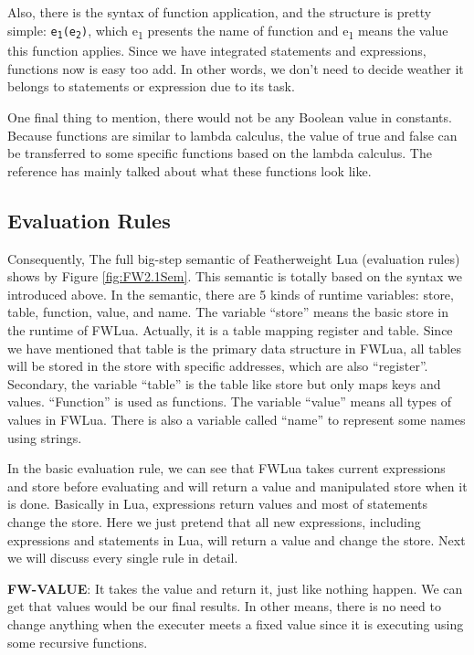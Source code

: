 Also, there is the syntax of function application, and the structure is pretty simple: {\tt e\textsubscript{1}(e\textsubscript{2})}, which e\textsubscript{1} presents the name of function and e\textsubscript{1} means the value this function applies. Since we have integrated statements and expressions, functions now is easy too add. In other words, we don't need to decide weather it belongs to statements or expression due to its task.

One final thing to mention, there would not be any Boolean value in constants. Because functions are similar to lambda calculus, the value of true and false can be transferred to some specific functions based on the lambda calculus. The reference\cite{LC} has mainly talked about what these functions look like.


\subsection{Evaluation Rules}\label{sec: FWLUAsemantic}
Consequently, The full big-step semantic of Featherweight Lua (evaluation rules) shows by Figure \ref{fig:FW2.1Sem}. This semantic is totally based on the syntax we introduced above. In the semantic, there are 5 kinds of runtime variables: store, table, function, value, and name. The variable ``store'' means the basic store in the runtime of FWLua. Actually, it is a table mapping register and table. Since we have mentioned that table is the primary data structure in FWLua, all tables will be stored in the store with specific addresses, which are also ``register''. Secondary, the variable ``table'' is the table like store but only maps keys and values. ``Function'' is used as functions. The variable ``value'' means all types of values in FWLua. There is also a variable called ``name'' to represent some names using strings.

In the basic evaluation rule, we can see that FWLua takes current expressions and store before evaluating and will return a value and manipulated store when it is done. Basically in Lua, expressions return values and most of statements change the store. Here we just pretend that all new expressions, including expressions and statements in Lua, will return a value and change the store. Next we will discuss every single rule in detail.

{\bf FW-VALUE}: It takes the value and return it, just like nothing happen. We can get that values would be our final results. In other means, there is no need to change anything when the executer meets a fixed value since it is executing using some recursive functions. 

